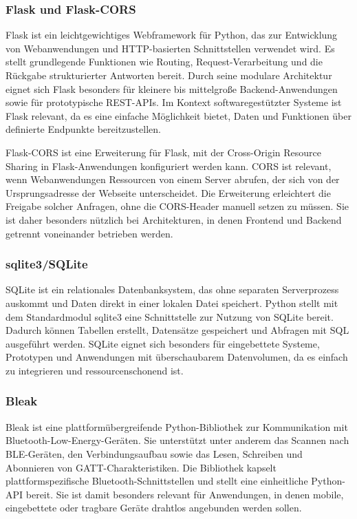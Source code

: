 \subsubsection{Flask und Flask-CORS}
Flask ist ein leichtgewichtiges Webframework für Python, das zur Entwicklung von Webanwendungen und HTTP-basierten Schnittstellen verwendet wird. Es stellt grundlegende Funktionen wie Routing, Request-Verarbeitung und die Rückgabe strukturierter Antworten bereit. Durch seine modulare Architektur eignet sich Flask besonders für kleinere bis mittelgroße Backend-Anwendungen sowie für prototypische REST-APIs. Im Kontext softwaregestützter Systeme ist Flask relevant, da es eine einfache Möglichkeit bietet, Daten und Funktionen über definierte Endpunkte bereitzustellen.\autocite[vgl.]{WelcomeFlaskFlaska}

\newpage
Flask-CORS ist eine Erweiterung für Flask, mit der Cross-Origin Resource Sharing in Flask-Anwendungen konfiguriert werden kann. CORS ist relevant, wenn Webanwendungen Ressourcen von einem Server abrufen, der sich von der Ursprungsadresse der Webseite unterscheidet. Die Erweiterung erleichtert die Freigabe solcher Anfragen, ohne die CORS-Header manuell setzen zu müssen. Sie ist daher besonders nützlich bei Architekturen, in denen Frontend und Backend getrennt voneinander betrieben werden.\autocite[vgl.]{FlaskCORSFlaskCors3010}

\subsubsection{sqlite3/SQLite}
SQLite ist ein relationales Datenbanksystem, das ohne separaten Serverprozess auskommt und Daten direkt in einer lokalen Datei speichert. Python stellt mit dem Standardmodul sqlite3 eine Schnittstelle zur Nutzung von SQLite bereit. Dadurch können Tabellen erstellt, Datensätze gespeichert und Abfragen mit SQL ausgeführt werden. SQLite eignet sich besonders für eingebettete Systeme, Prototypen und Anwendungen mit überschaubarem Datenvolumen, da es einfach zu integrieren und ressourcenschonend ist.\autocite[vgl.]{SQLiteDocumentation}\autocite[vgl.]{Sqlite3DBAPI20}

\subsubsection{Bleak}
Bleak ist eine plattformübergreifende Python-Bibliothek zur Kommunikation mit Bluetooth-Low-Energy-Geräten. Sie unterstützt unter anderem das Scannen nach BLE-Geräten, den Verbindungsaufbau sowie das Lesen, Schreiben und Abonnieren von GATT-Charakteristiken. Die Bibliothek kapselt plattformspezifische Bluetooth-Schnittstellen und stellt eine einheitliche Python-API bereit. Sie ist damit besonders relevant für Anwendungen, in denen mobile, eingebettete oder tragbare Geräte drahtlos angebunden werden sollen.\autocite[vlg.]{BleakBleak301}

